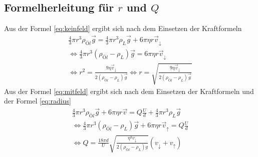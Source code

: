 \subsection{Formelherleitung für $r$ und $Q$}
Aus der Formel \ref{eq:keinfeld} ergibt sich nach dem Einsetzen der Kraftformeln
\begin{gather*}
\frac{4}{3}\pi r^3 \rho_{Öl}\vec{g}=\frac{4}{3}\pi r^3 \rho_{L}\vec{g}+6\pi \eta  r \vec{v}_{\downarrow}\\
\iff \frac{4}{3}\pi r^3 (\rho_{Öl}-\rho_{L})\vec{g}=6\pi \eta  r \vec{v}_{\downarrow}\\
\iff r^2=\frac{9\eta \vec{v}_{\downarrow}}{2(\rho_{Öl}-\rho_{L})\vec{g}}
\iff r=\sqrt{\frac{9\eta \vec{v}_{\downarrow}}{2(\rho_{Öl}-\rho_{L})\vec{g}}}
\end{gather*}
Aus der Formel \ref{eq:mitfeld} ergibt sich nach dem Einsetzen der Kraftformeln und der Formel \ref{eq:radius}
\begin{gather*}
\frac{4}{3}\pi r^3 \rho_{Öl}\vec{g}+6\pi \eta  r \vec{v}=Q\frac{U}{d}+\frac{4}{3}\pi r^3 \rho_{L}\vec{g}\\
\iff \frac{4}{3}\pi r^3 (\rho_{Öl}-\rho_{L})\vec{g}+6\pi \eta  r \vec{v}_{\uparrow}=Q\frac{U}{d}\\
\iff Q = \frac{18 \pi d}{U}\sqrt{\frac{\eta^3 v_{\downarrow}}{2(\rho_{Öl}-\rho_L)g}}(v_{\downarrow}+v_{\uparrow})
\end{gather*}
